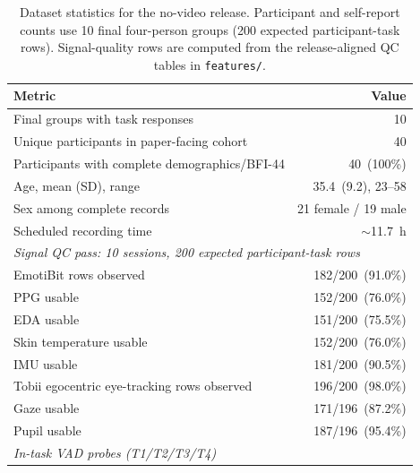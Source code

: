 
\begin{table}[t]
  \centering
  \caption{Dataset statistics for the no-video release. Participant and
    self-report counts use 10 final four-person groups (200 expected
    participant-task rows). Signal-quality rows are computed from the
    release-aligned QC tables in \texttt{features/}.}
  \label{tab:stats}
  \small
  \begin{tabular}{lr}
    \toprule
    \textbf{Metric} & \textbf{Value} \\
    \midrule
    Final groups with task responses                    & 10 \\
    Unique participants in paper-facing cohort          & 40 \\
    Participants with complete demographics/BFI-44      & 40~(100\%) \\
    Age, mean (SD), range                               & 35.4~(9.2), 23--58 \\
    Sex among complete records                          & 21 female / 19 male \\
    Scheduled recording time                            & $\sim$11.7~h \\
    \midrule
    \multicolumn{2}{l}{\textit{Signal QC pass: 10 sessions, 200 expected participant-task rows}} \\
    \midrule
    EmotiBit rows observed                              & 182/200~(91.0\%) \\
    PPG usable                                          & 152/200~(76.0\%) \\
    EDA usable                                          & 151/200~(75.5\%) \\
    Skin temperature usable                             & 152/200~(76.0\%) \\
    IMU usable                                          & 181/200~(90.5\%) \\
    Tobii egocentric eye-tracking rows observed         & 196/200~(98.0\%) \\
    Gaze usable                                         & 171/196~(87.2\%) \\
    Pupil usable                                        & 187/196~(95.4\%) \\
    \midrule
    \multicolumn{2}{l}{\textit{In-task VAD probes (T1/T2/T3/T4)}} \\

\end{tabular}
\end{table}
